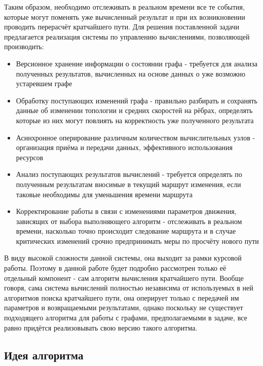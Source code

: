 \documentclass[12pt]{article}
\begin{document}
Таким образом, необходимо отслеживать в реальном времени все те события, которые могут поменять уже вычисленный результат и при их возникновении проводить перерасчёт кратчайшего пути. Для решения поставленной задачи предлагается реализация системы по управлению вычислениями, позволяющей производить:

\begin{itemize}
    \item Версионное хранение информации о состоянии графа - требуется для анализа полученных результатов, вычисленных на основе данных о уже возможно устаревшем графе
    \item Обработку поступающих изменений графа - правильно разбирать и сохранять данные об изменении топологии и средних скоростей на рёбрах, определять которые из них могут повлиять на корректность уже полученного результата
    \item Асинхронное оперирование различным количеством вычислительных узлов - организация приёма и передачи данных, эффективного использования ресурсов
    \item Анализ поступающих результатов вычислений - требуется определять по полученным результатам вносимые в текущий маршрут изменения, если таковые необходимы для уменьшения времени маршрута
    \item Корректирование работы в связи с изменениями параметров движения, зависящих от выбора выполняющего алгоритм - отслеживать в реальном времени, насколько точно происходит следование маршрута и в случае критических изменений срочно предпринимать меры по просчёту нового пути
\end{itemize}

В виду высокой сложности данной системы, она выходит за рамки курсовой работы. Поэтому в данной работе будет подробно рассмотрен только её отдельный компонент - сам алгоритм вычисления кратчайшего пути. Вообще говоря, сама система вычислений полностью независима от используемых в ней алгоритмов поиска кратчайшего пути, она оперирует только с передачей им параметров и возвращаемыми результатами, однако поскольку не существует подходящего алгоритма для работы с графами, предполагаемыми в задаче, все равно придётся реализовывать свою версию такого алгоритма. 

\subsection{Идея алгоритма}
\end{document}
